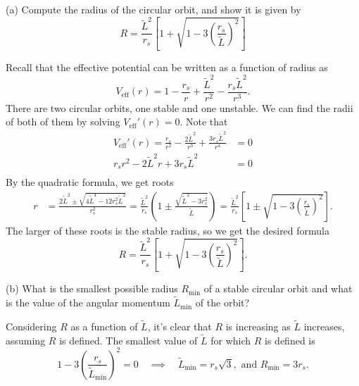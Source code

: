 \documentclass{../../templates/lkx_pset}
\begin{document}
\begin{parts}
	\begin{part}{(a)}
		Compute the radius of the circular orbit, and show it is given by
		\[
			R = \frac{\widetilde{L}^2}{r_s}\left[1 + \sqrt{1-3\left(\frac{r_s}{\widetilde{L}}\right)^2}\right]
		\]
	\end{part}

	Recall that the effective potential can be written as a function of radius as
	\[
		V_{\textrm{eff}}(r) = 1- \frac{r_s}{r} + \frac{\widetilde{L}^2}{r^2} - \frac{r_s \widetilde{L}^2}{r^3}.
	\]
	There are two circular orbits, one stable and one unstable. We can find the radii of both of them by solving $V_{\textrm{eff}}'(r)=0$. Note that
	\[
		\begin{aligned}
			V_{\textrm{eff}}'(r) = \frac{r_s}{r^2} - \frac{2\widetilde{L}^2}{r^3} + \frac{3 r_s \widetilde{L}^2}{r^4}
			                                                                    & = 0                                   \\
			r_s r^2 - 2\widetilde{L}^2 r + 3r_s \widetilde{L}^2 & = 0                                   \\
		\end{aligned}
	\]
	By the quadratic formula, we get roots
	\[
		\begin{aligned}
			r & = \frac{2\widetilde{L}^2 \pm \sqrt{4\widetilde{L}^4 - 12r^2_s \widetilde{L}^2}}{r_s^2} = \frac{\widetilde{L}^2}{r_s}\left(1\pm \frac{\sqrt{\widetilde{L}^2 - 3r_s^2}}{\widetilde{L}}\right) = \frac{\widetilde{L}^2}{r_s}\left[ 1 \pm \sqrt{1-3\left(\frac{r_s}{\widetilde{L}}\right)^2}\right].
		\end{aligned}
	\]
	The larger of these roots is the stable radius, so we get the desired formula
	\[
			R = \frac{\widetilde{L}^2}{r_s}\left[1 + \sqrt{1-3\left(\frac{r_s}{\widetilde{L}}\right)^2}\right].
	\]

	\begin{part}{(b)}
		What is the smallest possible radius $R_{\textrm{min}}$ of a stable circular orbit and what is the value of the angular momentum $\widetilde{L}_{\textrm{min}}$ of the orbit?
	\end{part}
  Considering $R$ as a function of $\widetilde{L}$, it's clear that $R$ is increasing as $\widetilde{L}$ increases, assuming $R$ is defined. The smallest value of $\widetilde{L}$ for which $R$ is defined is 
  \[
    1-3\left(\frac{r_s}{\widetilde{L}_{\textrm{min}}}\right)^2 = 0 \quad\implies\quad \widetilde{L}_{\textrm{min}} = r_s\sqrt{3}, \textrm{ and }R_{\textrm{min}} = 3r_s.
  \]


\end{parts}
\end{document}

